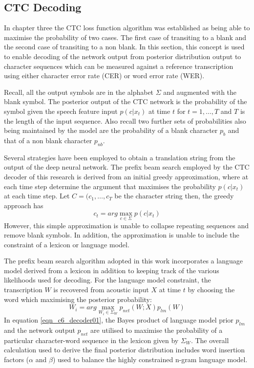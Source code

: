 {\subsection{CTC Decoding} \label{sec_c7_ctc_decoder}

In chapter three the CTC loss function algorithm was established as being able to maximise the probability of two cases.  The first case of transiting to a blank and the second case of transiting to a non blank.  In this section, this concept is used to enable decoding of the network output from posterior distribution output to character sequences which can be measured against a reference transcription using either character error rate (CER) or word error rate (WER).

Recall, all the output symbols are in the alphabet $\Sigma$ and augmented with the blank symbol. The posterior output of the CTC network is the probability of the symbol given the speech feature input $p(c|x_t)$ at time $t$ for $t=1,\dots,T$ and $T$ is the length of the input sequence.  Also recall two further sets of probabilities also being maintained by the model are the probability of a blank character $p_b$ and that of a non blank character $p_{nb}$.

Several strategies have been employed to obtain a translation string from the output of the deep neural network.  The prefix beam search employed by the CTC decoder of this research is derived from an initial greedy approximation, where at each time step determine the argument that maximises the  probability $p(c|x_t)$ at each time step. Let $C=(c_1,\dots,c_T$ be the character string then, the greedy approach has 
\begin{equation}
    c_t=arg\max_{c\in\Sigma}p(c|x_t)
\end{equation}
However, this simple approximation is unable to collapse repeating sequences and remove blank symbols. In addition, the approximation is unable to include the constraint of a lexicon or language model.

The prefix beam search algorithm \cite{hannun2014first} adopted in this work incorporates a language model derived from a lexicon in addition to keeping track of the various likelihoods used for decoding.  For the language model constraint, the transcription $W$ is recovered from acoustic input $X$ at time $t$ by choosing the word which maximising the posterior probability:
\begin{equation}
W_i=arg\max_{W_i \in \Sigma_W} p_{net}(W;X)p_{lm}(W)
\label{eqn_c6_decoder01}
\end{equation}
In equation \ref{eqn_c6_decoder01}, the Bayes product of language model prior $p_{lm}$ and the network output $p_{net}$ are utilised to maximise the probability of a particular character-word sequence in the lexicon given by $\Sigma_W$.  The overall calculation used to derive the final posterior distribution includes word insertion factors ($\alpha$ and $\beta$) used to balance the highly constrained n-gram language model.

}
